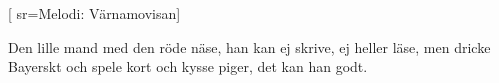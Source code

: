 
[
  sr={Melodi: Värnamovisan}]
  
\beginverse*
 Den lille mand med den röde näse,
han kan ej skrive, ej heller läse,
men dricke Bayerskt och spele kort
och kysse piger, det kan han godt.
\endverse
\endsong



